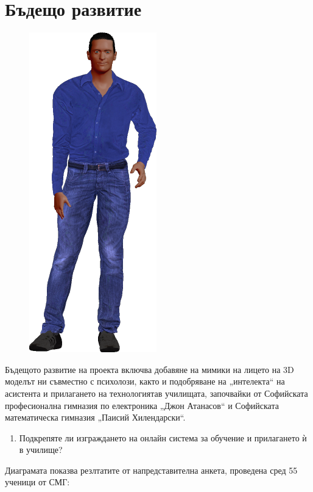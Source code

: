 \documentclass[a4paper, 12pt]{article}
\newenvironment{myblock}[1]
  {\begin{tcolorbox}[colback=green!5,colframe=green!40!black,title=#1]}
  {\end{tcolorbox}}
\begin{document}
	\section{Бъдещо развитие}
	\begin{figure}
		\includegraphics[scale=0.35]{../bad_boy.png}
	\end{figure}
	Бъдещото развитие на проекта включва добавяне на мимики на лицето на 3D моделът ни съвместно с психолози, както и подобряване на „интелекта“ на асистента и прилагането на технологиятав училищата, започвайки от Софийската професионална гимназия по електроника „Джон Атанасов“ и Софийската математическа гимназия „Паисий Хилендарски“. \\ \vspace{0.5cm}
	\begin{center}
		\begin{myblock}{Въпроси от анкета}
			\begin{enumerate}
				\item Подкрепяте ли изграждането на онлайн система за обучение и прилагането ѝ в училище?
			\end{enumerate}
		\end{myblock}
	\end{center}
	Диаграмата показва резлтатите от напредставителна анкета, проведена сред 55 ученици от СМГ: \\
	\begin{center}
	\end{center}
\end{document}

